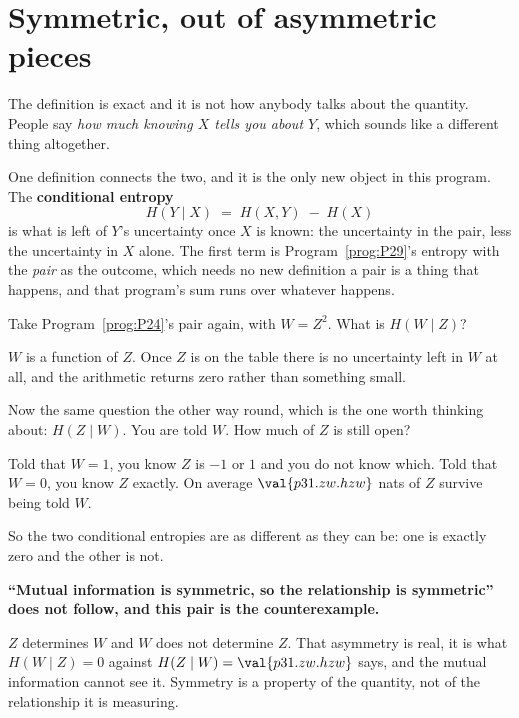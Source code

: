 \section{Symmetric, out of asymmetric pieces}
\label{sec:P31-conditional}

\begin{fr}
The definition is exact and it is not how anybody talks about the quantity.
People say \emph{how much knowing $X$ tells you about $Y$}, which sounds like
a different thing altogether.

One definition connects the two, and it is the only new object in this
program. The \textbf{conditional entropy}
\[ H(Y \mid X) \;=\; H(X, Y) \;-\; H(X) \]
is what is left of $Y$'s uncertainty once $X$ is known: the uncertainty in
the pair, less the uncertainty in $X$ alone. The first term is
Program~\ref{prog:P29}'s entropy with the \emph{pair} as the outcome, which
needs no new definition \dash{} a pair is a thing that happens, and that
program's sum runs over whatever happens.

Take Program~\ref{prog:P24}'s pair again, with $W = Z^{2}$. What is
$H(W \mid Z)$?
\dotline
\nextframe
\end{fr}

\begin{fr}

$W$ is a function of $Z$. Once $Z$ is on the table there is no uncertainty
left in $W$ at all, and the arithmetic returns zero rather than something
small.

Now the same question the other way round, which is the one worth thinking
about: $H(Z \mid W)$. You are told $W$. How much of $Z$ is still open?
\dotline
\nextframe
\end{fr}

\begin{fr}

Told that $W = 1$, you know $Z$ is $-1$ or $1$ and you do not know which.
Told that $W = 0$, you know $Z$ exactly. On average
$\val{p31.zw.hzw}$ nats of $Z$ survive being told $W$.

So the two conditional entropies are as different as they can be: one is
exactly zero and the other is not.

\begin{trapbox}
\textbf{\enquote{Mutual information is symmetric, so the relationship is
symmetric} does not follow, and this pair is the counterexample.}

$Z$ determines $W$ and $W$ does not determine $Z$. That asymmetry is real,
it is what $H(W \mid Z) = 0$ against $H(Z \mid W) = \val{p31.zw.hzw}$ says,
and the mutual information cannot see it. Symmetry is a property of the
quantity, not of the relationship it is measuring.
\end{trapbox}
\end{fr}

